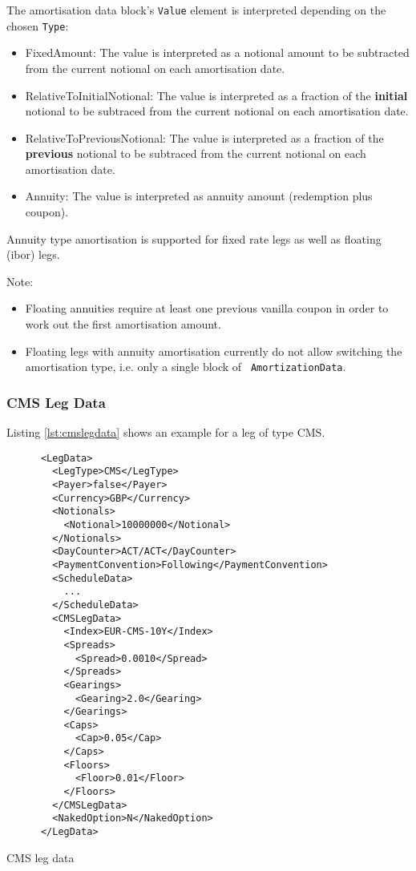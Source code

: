 The amortisation data block's {\tt Value} element  is interpreted
depending on the chosen {\tt Type}:
\begin{itemize}
\item FixedAmount: The value is interpreted as a notional amount to be
  subtracted from the current notional on each amortisation date.
\item RelativeToInitialNotional: The value is interpreted as a
  fraction of the {\bf initial} notional to be subtraced from the current
  notional on each amortisation date.
\item RelativeToPreviousNotional: The value is interpreted as a
  fraction of the {\bf previous} notional to be subtraced from the current
  notional on each amortisation date.
\item Annuity: The value is interpreted as annuity amount (redemption
  plus coupon).
\end{itemize}

Annuity type amortisation is supported for fixed rate legs as well as
floating (ibor) legs. 

Note:
\begin{itemize}
\item Floating annuities require at least one previous vanilla coupon
  in order to work out the first amortisation amount. 
\item Floating legs with annuity amortisation currently do not allow
  switching the amortisation type, i.e. only a  single block of {\tt
    AmortizationData}.
\end{itemize}

\subsubsection{CMS Leg Data}
\label{ss:cmslegdata}

Listing \ref{lst:cmslegdata} shows an example for a leg of type CMS. 

\begin{listing}[H]
\begin{verbatim}
      <LegData>
        <LegType>CMS</LegType>
        <Payer>false</Payer>
        <Currency>GBP</Currency>
        <Notionals>
          <Notional>10000000</Notional>
        </Notionals>
        <DayCounter>ACT/ACT</DayCounter>
        <PaymentConvention>Following</PaymentConvention>
        <ScheduleData>
          ...
        </ScheduleData>
        <CMSLegData>
          <Index>EUR-CMS-10Y</Index>
          <Spreads>
            <Spread>0.0010</Spread>
          </Spreads>
          <Gearings>
            <Gearing>2.0</Gearing>
          </Gearings>
          <Caps>
            <Cap>0.05</Cap>
          </Caps>
          <Floors>
            <Floor>0.01</Floor>
          </Floors>
        </CMSLegData>
        <NakedOption>N</NakedOption>
      </LegData>
\end{verbatim}
\caption{CMS leg data}
\label{lst:cmslegdata}
\end{listing}
 
